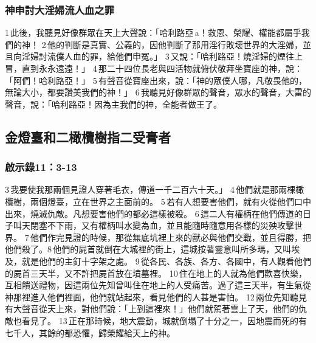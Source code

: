 \subsubsection{神申討大淫婦流人血之罪}

1 此後，我聽見好像群眾在天上大聲說：「哈利路亞 a！救恩、榮耀、權能都屬乎我們的神！ 2 他的判斷是真實、公義的，因他判斷了那用淫行敗壞世界的大淫婦，並且向淫婦討流僕人血的罪，給他們申冤。」 3 又說：「哈利路亞！燒淫婦的煙往上冒，直到永永遠遠！」 4 那二十四位長老與四活物就俯伏敬拜坐寶座的神，說：「阿們！哈利路亞！」 5 有聲音從寶座出來，說：「神的眾僕人哪，凡敬畏他的，無論大小，都要讚美我們的神！」 6 我聽見好像群眾的聲音，眾水的聲音，大雷的聲音，說：「哈利路亞！因為主我們的神，全能者做王了。







\subsection{金燈臺和二橄欖樹指二受膏者}

\subsubsection{啟示錄11：3-13}
 3 我要使我那兩個見證人穿著毛衣，傳道一千二百六十天。」 4 他們就是那兩棵橄欖樹，兩個燈臺，立在世界之主面前的。 5 若有人想要害他們，就有火從他們口中出來，燒滅仇敵。凡想要害他們的都必這樣被殺。 6 這二人有權柄在他們傳道的日子叫天閉塞不下雨，又有權柄叫水變為血，並且能隨時隨意用各樣的災殃攻擊世界。 7 他們作完見證的時候，那從無底坑裡上來的獸必與他們交戰，並且得勝，把他們殺了。8 他們的屍首就倒在大城裡的街上，這城按著靈意叫所多瑪，又叫埃及，就是他們的主釘十字架之處。 9 從各民、各族、各方、各國中，有人觀看他們的屍首三天半，又不許把屍首放在墳墓裡。 10 住在地上的人就為他們歡喜快樂，互相饋送禮物，因這兩位先知曾叫住在地上的人受痛苦。過了這三天半，有生氣從神那裡進入他們裡面，他們就站起來，看見他們的人甚是害怕。 12 兩位先知聽見有大聲音從天上來，對他們說：「上到這裡來！」他們就駕著雲上了天，他們的仇敵也看見了。 13 正在那時候，地大震動，城就倒塌了十分之一，因地震而死的有七千人，其餘的都恐懼，歸榮耀給天上的神。

